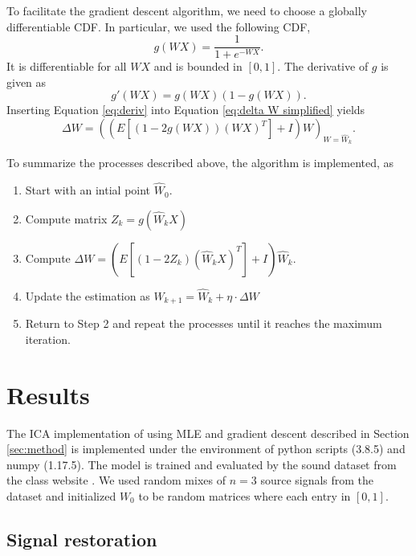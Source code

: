 \documentclass[conference]{IEEEtran}
\begin{document}
To facilitate the gradient descent algorithm, we need to choose a globally differentiable CDF. In particular, we used the following CDF,
\begin{equation}
    g(WX) = \frac{1}{1+e^{-WX}}.
\end{equation}
It is differentiable for all $WX$ and is bounded in $\left[0,1 \right]$. The derivative of $g$ is given as
\begin{equation}
\label{eq:deriv}
    g'(WX) = g(WX)(1-g(WX)).
\end{equation}
Inserting Equation \ref{eq:deriv} into Equation \ref{eq:delta W simplified} yields
\begin{equation}
    \Delta W = \left(\left(E\left[(1-2g(WX))(WX)^T\right] + I \right)W\right)_{W=\hat{W}_k}.
\end{equation}

To summarize the processes described above, the algorithm is implemented, as
\begin{enumerate}
    \item Start with an intial point $\hat{W}_0$.  
    \item Compute matrix $Z_k = g(\hat{W}_kX)$
    \item Compute $\Delta W = \left(E\left[(1-2Z_k)(\hat{W}_kX)^T\right] + I \right)\hat{W}_k$.
    \item Update the estimation as $\hat{W}_{k+1} = \hat{W}_k + \eta\cdot\Delta W$
    \item Return to Step 2 and repeat the processes until it reaches the maximum iteration.
\end{enumerate}


\section{Results} %

The ICA implementation of using MLE and gradient descent described in Section \ref{sec:method} is implemented under the environment of python scripts (3.8.5) and numpy (1.17.5). The model is trained and evaluated by the sound dataset from the class website \cite{cs391}. We used random mixes of $n=3$ source signals from the dataset and initialized $W_0$ to be random matrices where each entry in $[0, 1]$.


\subsection{Signal restoration}
\end{document}
